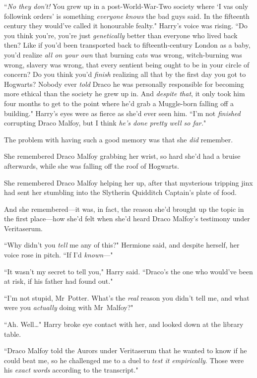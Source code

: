 ``\emph{No they don't!} You grew up in a post-World-War-Two society where `I vas only followink orders' is something \emph{everyone knows} the bad guys said. In the fifteenth century they would've called it honourable fealty." Harry's voice was rising. ``Do you think you're, you're just \emph{genetically} better than everyone who lived back then? Like if you'd been transported back to fifteenth-century London as a baby, you'd realize \emph{all on your own} that burning cats was wrong, witch-burning was wrong, slavery was wrong, that every sentient being ought to be in your circle of concern? Do you think you'd \emph{finish} realizing all that by the first day you got to Hogwarts? Nobody ever \emph{told} Draco he was personally responsible for becoming more ethical than the society he grew up in. And \emph{despite that}, it only took him four months to get to the point where he'd grab a Muggle-born falling off a building." Harry's eyes were as fierce as she'd ever seen him. ``I'm not \emph{finished} corrupting Draco Malfoy, but I think \emph{he's done pretty well so far.}"

The problem with having such a good memory was that she \emph{did} remember.

She remembered Draco Malfoy grabbing her wrist, so hard she'd had a bruise afterwards, while she was falling off the roof of Hogwarts.

She remembered Draco Malfoy helping her up, after that mysterious tripping jinx had sent her stumbling into the Slytherin Quidditch Captain's plate of food.

And she remembered—it was, in fact, the reason she'd brought up the topic in the first place—how she'd felt when she'd heard Draco Malfoy's testimony under Veritaserum.

``Why didn't you \emph{tell} me any of this?" Hermione said, and despite herself, her voice rose in pitch. ``If I'd \emph{known}—"

``It wasn't my secret to tell you," Harry said. ``Draco's the one who would've been at risk, if his father had found out."

``I'm not stupid, Mr~Potter. What's the \emph{real} reason you didn't tell me, and what were you \emph{actually} doing with Mr~Malfoy?"

``Ah. Well…" Harry broke eye contact with her, and looked down at the library table.

``Draco Malfoy told the Aurors under Veritaserum that he wanted to know if he could beat me, so he challenged me to a duel to \emph{test it empirically}. Those were his \emph{exact words} according to the transcript."

